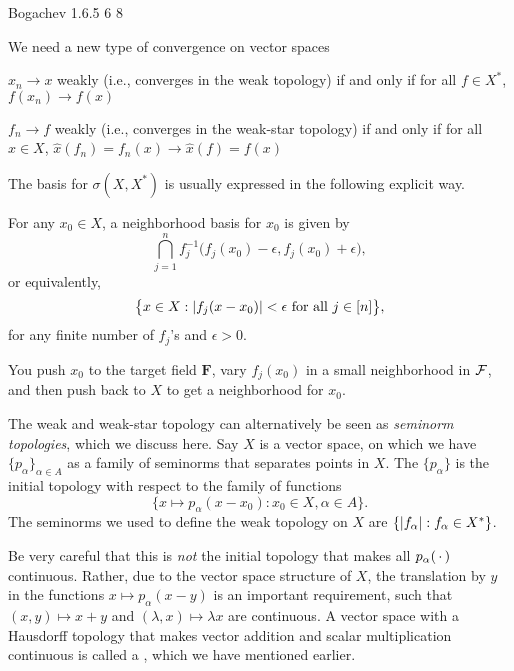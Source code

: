 Bogachev 1.6.5 6 8

We need a new type of convergence on vector spaces

$x_n \to x$ weakly (i.e., converges in the weak topology) if and only if for all $f \in X^*$, $f(x_n) \to f(x)$

$f_n \to f$ weakly (i.e., converges in the weak-star topology) if and only if for all $x \in X$, $\hat{x}(f_n) = f_n(x) \to \hat{x}(f) = f(x)$

The basis for $\sigma(X,X^*)$ is usually expressed in the following explicit way.

For any $x_0\in X$, a neighborhood basis for $x_0$ is given by \[
        \bigcap_{j=1}^n f^{-1}_j\bigl(f_j(x_0) - \epsilon, f_j(x_0) + \epsilon\bigr),
\] or equivalently,
\[
    \bigl\{x \in X: \lvert f_j(x - x_0) \rvert < \epsilon \text{ for all } j \in [n]\bigr\},
\]
for any finite number of $f_j$'s and $\epsilon > 0$.

You push $x_0$ to the target field $\mathbf F$, vary $f_j(x_0)$ in a small neighborhood in $\mathcal{F}$, and then push back to $X$ to get a neighborhood for $x_0$.

The weak and weak-star topology can alternatively be seen as \emph{seminorm topologies}, which we discuss here. Say $X$ is a vector space, on which we have $\{p_\alpha\}_{\alpha \in A}$ as a family of seminorms that separates points in $X$. The  $\{p_\alpha\}$ is the initial topology with respect to the family of functions \[\{x \mapsto p_\alpha(x - x_0) : x_0 \in X, \alpha \in A\}.\] The seminorms we used to define the weak topology on $X$ are $\{\lvert f_\alpha \rvert : f_\alpha \in X^*\}$.

Be very careful that this is \emph{not} the initial topology that makes all $p_\alpha(\,\cdot\,)$ continuous. Rather, due to the vector space structure of $X$, the translation by $y$ in the functions $x \mapsto p_\alpha (x-y)$ is an important requirement, such that $(x,y) \mapsto x + y$ and $(\lambda,x) \mapsto \lambda x$ are continuous. A vector space with a Hausdorff topology that makes vector addition and scalar multiplication continuous is called a , which we have mentioned earlier.

